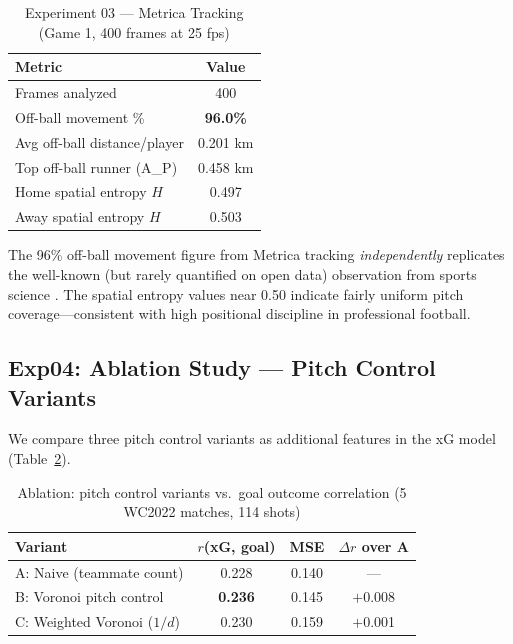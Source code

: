 \documentclass[10pt,twocolumn]{article}
\begin{document}
\begin{table}[h]
  \centering
  \caption{Experiment 03 — Metrica Tracking (Game 1, 400 frames at 25 fps)}
  \label{tab:metrica}
  \begin{tabular}{lc}
    \toprule
    Metric & Value \\
    \midrule
    Frames analyzed & 400 \\
    Off-ball movement \% & \textbf{96.0\%} \\
    Avg off-ball distance/player & 0.201 km \\
    Top off-ball runner (A\_P) & 0.458 km \\
    Home spatial entropy $H$ & 0.497 \\
    Away spatial entropy $H$ & 0.503 \\
    \bottomrule
  \end{tabular}
\end{table}

The 96\% off-ball movement figure from Metrica tracking \emph{independently} replicates the well-known (but rarely quantified on open data) observation from sports science \citep{dellasala2013}. The spatial entropy values near 0.50 indicate fairly uniform pitch coverage—consistent with high positional discipline in professional football.

\subsection{Exp04: Ablation Study — Pitch Control Variants}
\label{sec:ablation}

We compare three pitch control variants as additional features in the xG model (Table~\ref{tab:ablation}).

\begin{table}[h]
  \centering
  \caption{Ablation: pitch control variants vs.\ goal outcome correlation (5 WC2022 matches, 114 shots)}
  \label{tab:ablation}
  \begin{tabular}{lccc}
    \toprule
    Variant & $r$(xG, goal) & MSE & $\Delta r$ over A \\
    \midrule
    A: Naive (teammate count) & 0.228 & 0.140 & --- \\
    B: Voronoi pitch control & \textbf{0.236} & 0.145 & $+$0.008 \\
    C: Weighted Voronoi ($1/d$) & 0.230 & 0.159 & $+$0.001 \\
    \bottomrule
  \end{tabular}
\end{table}
\end{document}
